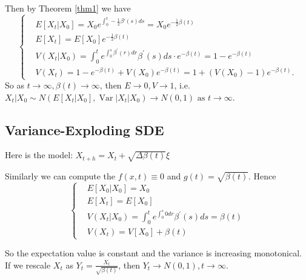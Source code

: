 \documentclass{article}
\begin{document}
Then by Theorem \ref{thm1} we have
\begin{equation}
    \left\{\begin{aligned}
    &E\left[X_{t} | X_{0}\right]=X_{0} e^{\int_{0}^{t}-\frac{1}{2} \beta'(s) d s}=X_{0} e^{-\frac{1}{2} \beta(t)} \\
    &E\left[X_{t}\right]=E\left[X_{0}\right] e^{-\frac{1}{2} \beta(t)} \\
    &V\left(X_{t} | X_{0}\right)=\int_{0}^{t} e^{\int_{0}^{s} \beta^{\prime}(r) d r} \beta^{\prime}(s) d s \cdot e^{-\beta(t)}=1-e^{-\beta(t)} \\
    &V\left(X_{t}\right)=1-e^{-\beta(t)}+V\left(X_{0}\right) e^{-\beta(t)}=1+\left(V\left(X_{0}\right)-1\right) e^{-\beta(t)} .
    \end{aligned}\right.
\end{equation}
So as  $t \rightarrow \infty,\beta(t) \rightarrow \infty$, then  $E \rightarrow 0, V \rightarrow 1$, i.e. 
$X_{t} | X_{0} \sim N\left(E\left[X_{t} | X_{0}\right], \operatorname{Var}\left|X_{t}\right| X_{0}\right)\rightarrow N(0,1) \text{ as } t \rightarrow \infty$.
 
\subsection{Variance-Exploding SDE}
Here is the model: 
$X_{t+h}=X_{t}+\sqrt{\Delta \beta(t)} \xi$

Similarly we can compute the $f(x, t)\equiv 0$ and $g(t)=\sqrt{\beta(t)}$.
Hence  
\begin{equation}\left\{
    \begin{aligned}
        &E\left[X_{0} | X_{0}\right]=X_{0}\\
        &E\left[X_{t}\right]=E\left[X_{0}\right] \\ 
        &V\left(X_{t} | X_{0}\right)=\int_{0}^{t} e^{\int_{0}^{s} 0 d r} \beta^{\prime}(s) d s=\beta(t)\\ 
        &V\left(X_{t}\right)=V\left[X_{0}\right]+\beta(t)
    \end{aligned}\right.
\end{equation}

So the expectation value is constant and the variance is increasing monotonical. \\
If we rescale  $X_{t}$ as $Y_{t}=\frac{X_{t}}{\sqrt{\beta(t)}}$, then $Y_t \rightarrow N(0,1), t \rightarrow \infty$.
\end{document}
